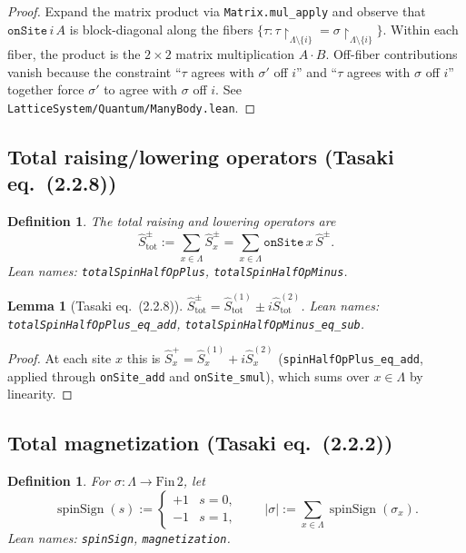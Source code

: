 \documentclass[a4paper,11pt]{article}
\newtheorem{lemma}[theorem]{Lemma}
\newtheorem{definition}[theorem]{Definition}
\begin{document}
\begin{proof}
Expand the matrix product via \texttt{Matrix.mul\_apply} and observe
that $\texttt{onSite}\,i\,A$ is block-diagonal along the fibers
$\{\tau : \tau \upharpoonright_{\Lambda\setminus\{i\}} = \sigma
 \upharpoonright_{\Lambda\setminus\{i\}}\}$. Within each fiber, the
product is the $2\times 2$ matrix multiplication $A \cdot B$.
Off-fiber contributions vanish because the constraint
``$\tau$ agrees with $\sigma'$ off $i$'' and
``$\tau$ agrees with $\sigma$ off $i$'' together force $\sigma'$ to
agree with $\sigma$ off $i$. See
\texttt{LatticeSystem/Quantum/ManyBody.lean}.
\end{proof}

\subsection{Total raising/lowering operators (Tasaki eq.~(2.2.8))}

\begin{definition}
The total raising and lowering operators are
\[
  \hat S^{\pm}_{\mathrm{tot}}
    := \sum_{x \in \Lambda} \hat S_x^{\pm}
    = \sum_{x \in \Lambda} \texttt{onSite}\,x\,\hat S^{\pm}.
\]
Lean names: \texttt{totalSpinHalfOpPlus}, \texttt{totalSpinHalfOpMinus}.
\end{definition}

\begin{lemma}[Tasaki eq.~(2.2.8)]
$\hat S^{\pm}_{\mathrm{tot}}
  = \hat S^{(1)}_{\mathrm{tot}} \pm i \hat S^{(2)}_{\mathrm{tot}}$.
Lean names: \texttt{totalSpinHalfOpPlus\_eq\_add},
\texttt{totalSpinHalfOpMinus\_eq\_sub}.
\end{lemma}

\begin{proof}
At each site $x$ this is
$\hat S_x^{+} = \hat S_x^{(1)} + i\hat S_x^{(2)}$
(\texttt{spinHalfOpPlus\_eq\_add}, applied through
\texttt{onSite\_add} and \texttt{onSite\_smul}), which sums over
$x \in \Lambda$ by linearity.
\end{proof}

\subsection{Total magnetization (Tasaki eq.~(2.2.2))}

\begin{definition}
For $\sigma : \Lambda \to \mathrm{Fin}\,2$, let
\[
  \operatorname{spinSign}(s) := \begin{cases} +1 & s = 0, \\ -1 & s = 1, \end{cases}
  \qquad
  |\sigma| := \sum_{x \in \Lambda} \operatorname{spinSign}(\sigma_x).
\]
Lean names: \texttt{spinSign}, \texttt{magnetization}.
\end{definition}
\end{document}
